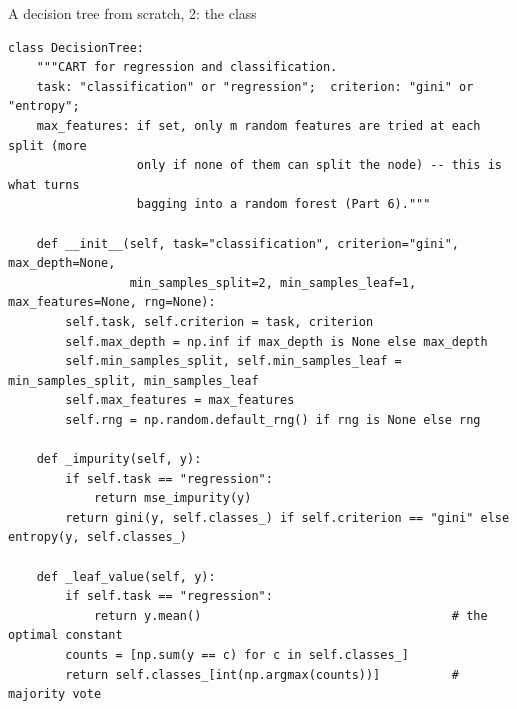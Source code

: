 \documentclass[10pt,aspectratio=169]{beamer}
\begin{document}
\begin{frame}[fragile]{A decision tree from scratch, 2: the class}
\begin{lstlisting}
class DecisionTree:
    """CART for regression and classification.
    task: "classification" or "regression";  criterion: "gini" or "entropy";
    max_features: if set, only m random features are tried at each split (more
                  only if none of them can split the node) -- this is what turns
                  bagging into a random forest (Part 6)."""

    def __init__(self, task="classification", criterion="gini", max_depth=None,
                 min_samples_split=2, min_samples_leaf=1, max_features=None, rng=None):
        self.task, self.criterion = task, criterion
        self.max_depth = np.inf if max_depth is None else max_depth
        self.min_samples_split, self.min_samples_leaf = min_samples_split, min_samples_leaf
        self.max_features = max_features
        self.rng = np.random.default_rng() if rng is None else rng

    def _impurity(self, y):
        if self.task == "regression":
            return mse_impurity(y)
        return gini(y, self.classes_) if self.criterion == "gini" else entropy(y, self.classes_)

    def _leaf_value(self, y):
        if self.task == "regression":
            return y.mean()                                   # the optimal constant
        counts = [np.sum(y == c) for c in self.classes_]
        return self.classes_[int(np.argmax(counts))]          # majority vote
\end{lstlisting}
\end{frame}
\end{document}

